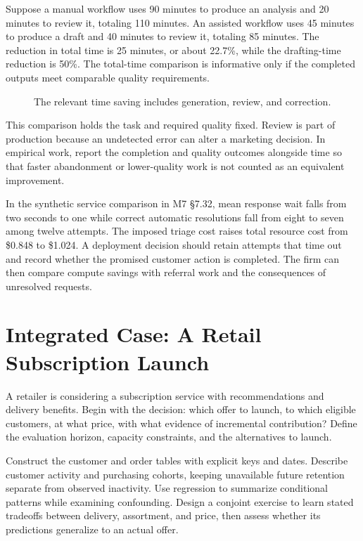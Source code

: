 Suppose a manual workflow uses 90 minutes to produce an analysis and 20
minutes to review it, totaling 110 minutes. An assisted workflow uses 45
minutes to produce a draft and 40 minutes to review it, totaling 85
minutes. The reduction in total time is 25 minutes, or about 22.7\%,
while the drafting-time reduction is 50\%. The total-time comparison is
informative only if the completed outputs meet comparable quality
requirements.

\begin{figure}[htbp]
\centering

\caption{The relevant time saving includes generation, review, and correction.}\label{fig:M08_workflow_time}
\end{figure}

This comparison holds the task and required quality fixed. Review is
part of production because an undetected error can alter a marketing
decision. In empirical work, report the completion and quality outcomes
alongside time so that faster abandonment or lower-quality work is not
counted as an equivalent improvement.

\noindent In the synthetic service comparison in M7 §7.32, mean response
wait falls from two seconds to one while correct automatic resolutions
fall from eight to seven among twelve attempts. The imposed triage cost
raises total resource cost from \$0.848 to \$1.024. A deployment
decision should retain attempts that time out and record whether the
promised customer action is completed. The firm can then compare compute
savings with referral work and the consequences of unresolved requests.

\hypertarget{M08-integrated-case-a-retail-subscription-launch}{%
\section{Integrated Case: A Retail Subscription
Launch}\label{M08-integrated-case-a-retail-subscription-launch}}

\noindent A retailer is considering a subscription service with recommendations
and delivery benefits. Begin with the decision: which offer to launch,
to which eligible customers, at what price, with what evidence of
incremental contribution? Define the evaluation horizon, capacity
constraints, and the alternatives to launch.

Construct the customer and order tables with explicit keys and dates.
Describe customer activity and purchasing cohorts, keeping unavailable
future retention separate from observed inactivity. Use regression to
summarize conditional patterns while examining confounding. Design a
conjoint exercise to learn stated tradeoffs between delivery,
assortment, and price, then assess whether its predictions generalize to
an actual offer.

